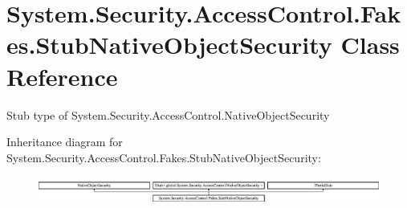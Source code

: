 \hypertarget{class_system_1_1_security_1_1_access_control_1_1_fakes_1_1_stub_native_object_security}{\section{System.\-Security.\-Access\-Control.\-Fakes.\-Stub\-Native\-Object\-Security Class Reference}
\label{class_system_1_1_security_1_1_access_control_1_1_fakes_1_1_stub_native_object_security}
}


Stub type of System.\-Security.\-Access\-Control.\-Native\-Object\-Security 


Inheritance diagram for System.\-Security.\-Access\-Control.\-Fakes.\-Stub\-Native\-Object\-Security\-:\begin{figure}[H]
\begin{center}
\leavevmode
\includegraphics[height=0.906149cm]{class_system_1_1_security_1_1_access_control_1_1_fakes_1_1_stub_native_object_security}
\end{center}
\end{figure}
